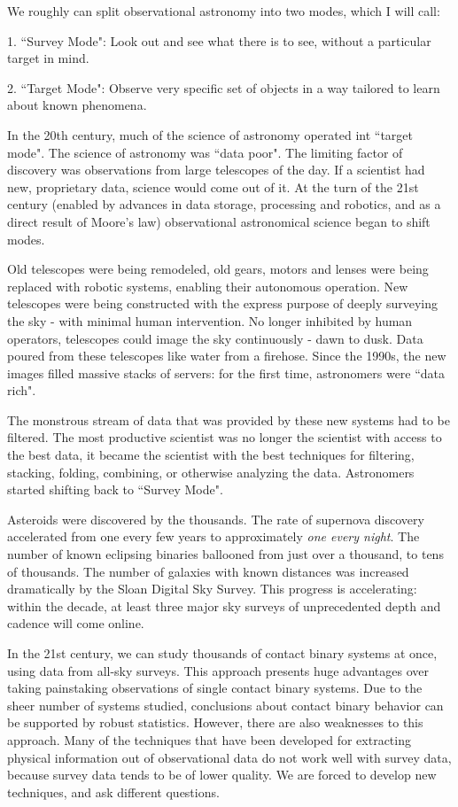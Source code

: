 \documentclass[12pt]{article} %
\numberwithin{equation}{section} %
\begin{document}
We roughly can split observational astronomy into two modes, which I will call:

1. ``Survey Mode": Look out and see what there is to see, without a particular target in mind.

2. ``Target Mode": Observe very specific set of objects in a way tailored to learn about known phenomena.

In the 20th century, much of the science of astronomy operated int ``target mode". The science of astronomy was ``data poor". The limiting factor of discovery was observations from large telescopes of the day. If a scientist had new, proprietary data, science would come out of it. At the turn of the 21st century (enabled by advances in data storage, processing and robotics, and as a direct result of Moore's law) observational astronomical science began to shift modes.

Old telescopes were being remodeled, old gears, motors and lenses were being replaced with robotic systems, enabling their autonomous operation. New telescopes were being constructed with the express purpose of deeply surveying the sky - with minimal human intervention. No longer inhibited by human operators, telescopes could image the sky continuously - dawn to dusk. Data poured from these telescopes like water from a firehose. Since the 1990s, the new images filled massive stacks of servers: for the first time, astronomers were ``data rich". 

The monstrous stream of data that was provided by these new systems had to be filtered. The most productive scientist was no longer the scientist with access to the best data, it became the scientist with the best techniques for filtering, stacking, folding, combining, or otherwise analyzing the data. Astronomers started shifting back to ``Survey Mode".

Asteroids were discovered by the thousands. The rate of supernova discovery accelerated from one every few years to approximately \emph{one every night}.  The number of known eclipsing binaries ballooned from just over a thousand, to tens of thousands. The number of galaxies with known distances was increased dramatically by the Sloan Digital Sky Survey. This progress is accelerating: within the decade, at least three major sky surveys of unprecedented depth and cadence will come online.

In the 21st century, we can study thousands of contact binary systems at once, using data from all-sky surveys. This approach presents huge advantages over taking painstaking observations of single contact binary systems. Due to the sheer number of systems studied, conclusions about contact binary behavior can be supported by robust statistics. However, there are also weaknesses to this approach. Many of the techniques that have been developed for extracting physical information out of observational data do not work well with survey data, because survey data tends to be of lower quality. We are forced to develop new techniques, and ask different questions.
\end{document}
